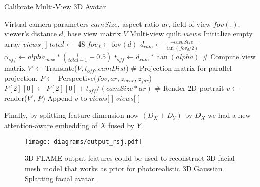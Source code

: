 \documentclass[a4paper,twocolumn]{article}
\begin{document}
\begin{algorithm}
\caption{Calibrate Multi-View 3D Avatar}
\label{alg:calib}
\begin{algorithmic}[1]
\REQUIRE Virtual camera parameters $camSize$, aspect ratio $ar$, field-of-view $fov(.)$, viewer's distance $d$, base view matrix $V$
\ENSURE Multi-view quilt $views$
\STATE Initialize empty array $views$[ ]
\STATE $total \gets$ 48
\STATE $fov_d \gets $fov$(d)$
\STATE $d_{cam} \gets \frac{-camSize}{\tan(fov_d / 2)}$
\STATE $\alpha_{off} \gets alpha_{max} * (\frac{i}{total - 1} - 0.5)$
\STATE $t_{off} \gets d_{cam} *\tan(alpha)$
\STATE
\STATE \# Compute view matrix
\STATE $V'\gets$Translate($V,t_{off}, camDist$)
\STATE
\STATE \# Projection matrix for parallel projection.
\STATE $P \gets$ Perspective($fov, ar, z_{near}, z_{far}$)
\STATE $P[2][0]\gets P[2][0]+t_{off}/(camSize * ar)$
\STATE
\STATE \# Render 2D portrait
\STATE $v \gets$ render($V'$, $P$)    
\STATE Append $v$ to $views$[ ]
\ENDFOR
\STATE \RETURN $views$[ ]
\end{algorithmic}
\end{algorithm}

Finally, by splitting feature dimension now $(D_{X} + D_{Y})$ by $D_X$ we had a new attention-aware embedding of $X$ fused by $Y$.

\begin{figure}[t]
\centering
\texttt{[image: diagrams/output\_rsj.pdf]}
\caption{\label{fig:FLAME}3D FLAME output features could be used to reconstruct 3D facial mesh model that works as prior for photorealistic 3D Gaussian Splatting facial avatar.}
\end{figure}
\end{document}
